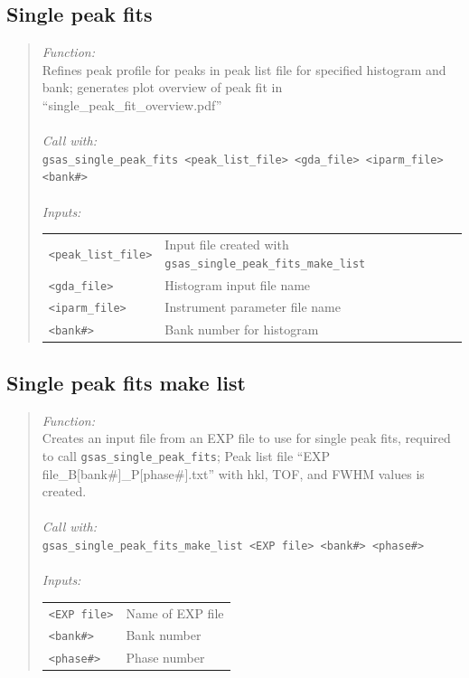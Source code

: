 \documentclass{article}
\begin{document}
\subsection{Single peak fits}
\begin{quote}
\textit{Function:} \\
Refines peak profile for peaks in peak list file for specified histogram and bank; 
generates plot overview of peak fit in ``single\_peak\_fit\_overview.pdf'' \\ \\
\textit{Call with:} \\
\texttt{gsas\_single\_peak\_fits <peak\_list\_file> <gda\_file> <iparm\_file> <bank\#>} \\ \\
\textit{Inputs:}\\
\begin{tabular}[t]{l l}
\texttt{<peak\_list\_file>} & Input file created with \texttt{gsas\_single\_peak\_fits\_make\_list} \\
\texttt{<gda\_file>} &  Histogram input file name \\
\texttt{<iparm\_file>} & Instrument parameter file name \\
\texttt{<bank\#>} &  Bank number for histogram \\
\end{tabular}
\end{quote}

\subsection{Single peak fits make list}
\begin{quote}
\textit{Function:} \\
Creates an input file from an EXP file to use for single peak fits, required to call \texttt{gsas\_single\_peak\_fits};
Peak list file ``EXP file\_B[bank\#]\_P[phase\#].txt'' with hkl, TOF, and FWHM values is created. \\ \\
\textit{Call with:}\\
\texttt{gsas\_single\_peak\_fits\_make\_list <EXP file> <bank\#> <phase\#>} \\ \\ 
\textit{Inputs:}\\
\begin{tabular}[t]{l l}
\texttt{<EXP file>} &  Name of EXP file \\
\texttt{<bank\#>} & Bank number \\
\texttt{<phase\#>} & Phase number \\ 
\end{tabular}
\end{quote}
\end{document}
